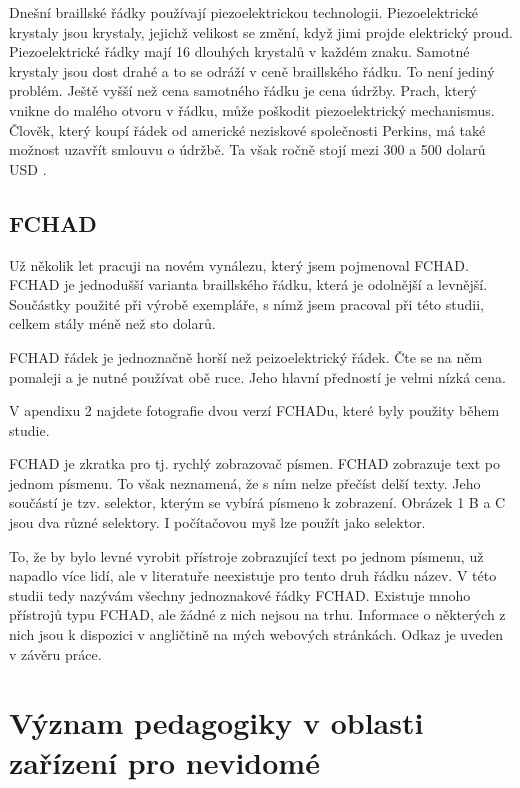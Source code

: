 Dnešní braillské řádky používají piezoelektrickou technologii.  Piezoelektrické krystaly jsou krystaly, jejichž velikost se změní, když jimi projde elektrický proud. Piezoelektrické řádky mají 16 dlouhých krystalů v každém znaku.  Samotné krystaly jsou dost drahé a to se odráží v ceně braillského řádku. To není jediný problém.  Ještě vyšší než cena samotného řádku je cena údržby.  Prach, který vnikne do malého otvoru v řádku, může poškodit piezoelektrický mechanismus.  Člověk, který koupí řádek od americké neziskové společnosti Perkins, má také možnost uzavřít smlouvu o údržbě. Ta však ročně stojí mezi 300 a 500 dolarů USD \citep{perkinsdisplays}.

\subsection{FCHAD}

Už několik let pracuji na novém vynálezu, který jsem pojmenoval FCHAD. FCHAD je jednodušší varianta braillského řádku, která je odolnější a levnější.  Součástky použité při výrobě exempláře, s nímž jsem pracoval při této studii, celkem stály méně než sto dolarů.

FCHAD řádek je jednoznačně horší než peizoelektrický řádek.  Čte se na něm pomaleji a je nutné používat obě ruce.  Jeho hlavní předností je velmi nízká cena.

V apendixu 2 najdete fotografie dvou verzí FCHADu, které byly použity během studie.

FCHAD je zkratka pro  tj. rychlý zobrazovač písmen.  FCHAD zobrazuje text po jednom písmenu. To však neznamená, že s ním nelze přečíst delší texty.  Jeho součástí je tzv. selektor, kterým se vybírá písmeno k zobrazení. Obrázek 1 B a C jsou dva různé selektory.  I počítačovou myš lze použít jako selektor.

To, že by bylo levné vyrobit přístroje zobrazující text po jednom písmenu, už napadlo více lidí, ale v literatuře neexistuje pro tento druh řádku název. V této studii tedy nazývám všechny jednoznakové řádky FCHAD.  Existuje mnoho přístrojů typu FCHAD, ale žádné z nich nejsou na trhu.  Informace o některých z nich jsou k dispozici v angličtině na mých webových stránkách. Odkaz je uveden v závěru práce.

\section{Význam pedagogiky v oblasti zařízení pro nevidomé}

